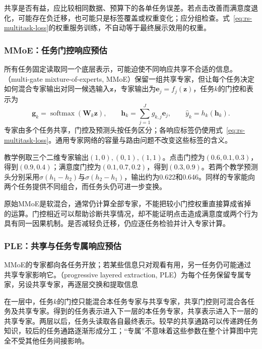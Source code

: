 共享是否有益，应比较相同数据、预算下的各单任务误差。若点击改善而满意度退化，可能存在负迁移，也可能只是标签覆盖或权重变化；应分组检查。式~\eqref{eq:rs-multitask-loss}的权重服务训练，不自动等于最终展示效用的权重。

\subsubsection{MMoE：任务门控响应预估}
\label{sec:rs-mmoe}

所有任务固定读取同一个底层表示，可能迫使不同响应共享不合适的信息。（multi-gate mixture-of-experts, MMoE）保留一组共享专家，但让每个任务决定如何混合专家输出对同一候选输入$\bm z$，专家输出为$\bm e_j=f_j(\bm z)$，任务$k$的门控和表示为
\begin{equation}
 \bm g_k=\operatorname{softmax}(\bm W_k\bm z),\qquad
 \bm h_k=\sum_{j=1}^{J}g_{k,j}\bm e_j,\qquad
 \widehat y_k=h_k(\bm h_k).
 \label{eq:rs-mmoe}
\end{equation}
专家由多个任务共享，门控及预测头按任务区分；各响应标签仍使用式~\eqref{eq:rs-multitask-loss}。通用专家网络的容量与路由问题不改变这些标签的含义。

教学例取三个二维专家输出$(1,0),(0,1),(1,1)$。点击门控为$(0.6,0.1,0.3)$，得到$(0.9,0.4)$；满意度门控为$(0.1,0.7,0.2)$，得到$(0.3,0.9)$。若两个教学预测头分别采用$\sigma(h_1-h_2)$与$\sigma(h_2-h_1)$，输出约为0.622和0.646。同样的专家能向两个任务提供不同组合，而任务头仍可进一步变换。

原始MMoE是软混合，通常仍计算全部专家，不能把较小门控权重直接算成省掉的运算。门控相近可以帮助诊断共享情况，却不能证明点击造成满意度或两个行为具有同一因果机制。是否减轻负迁移，仍应逐任务检验并计入专家计算。

\subsubsection{PLE：共享与任务专属响应预估}
\label{sec:rs-ple}

MMoE的专家都向各任务开放；若某些信息只对观看有用，另一任务仍可能通过共享专家影响它。（progressive layered extraction, PLE）为每个任务保留专属专家，另设共享专家，再逐层交换和提取信息

在一层中，任务$k$的门控只能混合本任务专家与共享专家，共享门控则可混合各任务及共享专家。得到的任务表示进入下一层的本任务专家，共享表示进入下一层的共享专家。两层以后，任务头读取各自最终表示。较早的共享通路可以传递跨任务知识，较后的任务通路逐渐形成分工；“专属”不意味着这些参数在整个计算图中完全不受其他任务间接影响。

